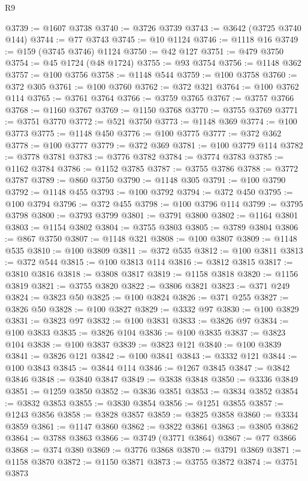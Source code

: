 \begin{lexlean}{R9}
\begin{coremodule}
@3739 := @1607 @3738
@3740 := @3726 @3739
@3743 := @3642 (@3725 @3740 @144)
@3744 := @77 @3743
@3745 := @10 @1124
@3746 := @1118 @16
@3749 := @159 (@3745 @3746) @1124
@3750 := @42 @127
@3751 := @479 @3750
@3754 := @45 @1724 (@48 @1724)
@3755 := @93 @3754
@3756 := @1148 @362
@3757 := @100 @3756
@3758 := @1148 @544
@3759 := @100 @3758
@3760 := @372 @305
@3761 := @100 @3760
@3762 := @372 @321
@3764 := @100 @3762 @114
@3765 := @3761 @3764
@3766 := @3759 @3765
@3767 := @3757 @3766
@3768 := @1160 @3767
@3769 := @1150 @3768
@3770 := @3755 @3769
@3771 := @3751 @3770
@3772 := @521 @3750
@3773 := @1148 @369
@3774 := @100 @3773
@3775 := @1148 @450
@3776 := @100 @3775
@3777 := @372 @362
@3778 := @100 @3777
@3779 := @372 @369
@3781 := @100 @3779 @114
@3782 := @3778 @3781
@3783 := @3776 @3782
@3784 := @3774 @3783
@3785 := @1162 @3784
@3786 := @1152 @3785
@3787 := @3755 @3786
@3788 := @3772 @3787
@3789 := @860 @3750
@3790 := @1148 @305
@3791 := @100 @3790
@3792 := @1148 @455
@3793 := @100 @3792
@3794 := @372 @450
@3795 := @100 @3794
@3796 := @372 @455
@3798 := @100 @3796 @114
@3799 := @3795 @3798
@3800 := @3793 @3799
@3801 := @3791 @3800
@3802 := @1164 @3801
@3803 := @1154 @3802
@3804 := @3755 @3803
@3805 := @3789 @3804
@3806 := @867 @3750
@3807 := @1148 @321
@3808 := @100 @3807
@3809 := @1148 @535
@3810 := @100 @3809
@3811 := @372 @535
@3812 := @100 @3811
@3813 := @372 @544
@3815 := @100 @3813 @114
@3816 := @3812 @3815
@3817 := @3810 @3816
@3818 := @3808 @3817
@3819 := @1158 @3818
@3820 := @1156 @3819
@3821 := @3755 @3820
@3822 := @3806 @3821
@3823 := @371 @249
@3824 := @3823 @50
@3825 := @100 @3824
@3826 := @371 @255
@3827 := @3826 @50
@3828 := @100 @3827
@3829 := @3332 @97
@3830 := @100 @3829
@3831 := @3823 @97
@3832 := @100 @3831
@3833 := @3826 @97
@3834 := @100 @3833
@3835 := @3826 @104
@3836 := @100 @3835
@3837 := @3823 @104
@3838 := @100 @3837
@3839 := @3823 @121
@3840 := @100 @3839
@3841 := @3826 @121
@3842 := @100 @3841
@3843 := @3332 @121
@3844 := @100 @3843
@3845 := @3844 @114
@3846 := @1267 @3845
@3847 := @3842 @3846
@3848 := @3840 @3847
@3849 := @3838 @3848
@3850 := @3336 @3849
@3851 := @1259 @3850
@3852 := @3836 @3851
@3853 := @3834 @3852
@3854 := @3832 @3853
@3855 := @3830 @3854
@3856 := @1251 @3855
@3857 := @1243 @3856
@3858 := @3828 @3857
@3859 := @3825 @3858
@3860 := @3334 @3859
@3861 := @1147 @3860
@3862 := @3822 @3861
@3863 := @3805 @3862
@3864 := @3788 @3863
@3866 := @3749 (@3771 @3864)
@3867 := @77 @3866
@3868 := @374 @380
@3869 := @3776 @3868
@3870 := @3791 @3869
@3871 := @1158 @3870
@3872 := @1150 @3871
@3873 := @3755 @3872
@3874 := @3751 @3873

\end{coremodule}
\end{lexlean}
